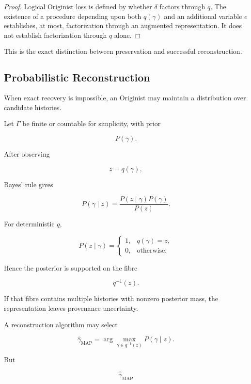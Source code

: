 \documentclass[
  11pt,
  a4paper,
  DIV=12,
  BCOR=0mm,
  parskip=half-
]{scrartcl}
\theoremstyle{definition}
\theoremstyle{plain}
\theoremstyle{remark}
\begin{document}
\begin{proof}
Logical Originist loss is defined by whether \(\delta\) factors through \(q\).
The existence of a procedure depending upon both \(q(\gamma)\) and an
additional variable \(e\) establishes, at most, factorization through an
augmented representation. It does not establish factorization through \(q\)
alone.
\end{proof}

This is the exact distinction between preservation and successful
reconstruction.


\subsection{Probabilistic Reconstruction}
\label{app:bayesian-reconstruction}

When exact recovery is impossible, an Originist may maintain a distribution
over candidate histories.

Let \(\Gamma\) be finite or countable for simplicity, with prior

\[
  P(\gamma).
\]

After observing

\[
  z=q(\gamma),
\]

Bayes' rule gives

\[
  P(\gamma\mid z)
  =
  \frac{
    P(z\mid\gamma)P(\gamma)
  }{
    P(z)
  }.
\]

For deterministic \(q\),

\[
  P(z\mid\gamma)
  =
  \begin{cases}
    1,&q(\gamma)=z,\\
    0,&\text{otherwise.}
  \end{cases}
\]

Hence the posterior is supported on the fibre

\[
  q^{-1}(z).
\]

If that fibre contains multiple histories with nonzero posterior mass, the
representation leaves provenance uncertainty.

A reconstruction algorithm may select

\[
  \widehat\gamma_{\mathrm{MAP}}
  =
  \arg\max_{\gamma\in q^{-1}(z)}
  P(\gamma\mid z).
\]

But

\[
  \widehat\gamma_{\mathrm{MAP}}
\]
\end{document}
